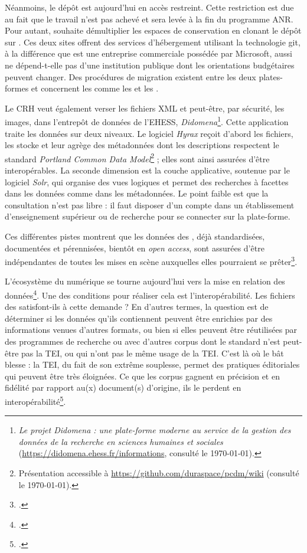 Néanmoins, le dépôt \gitlab{} est aujourd'hui en accès restreint. Cette restriction est due au fait que le travail n'est pas achevé et sera levée à la fin du programme ANR. Pour autant, \timeus{} souhaite démultiplier les espaces de conservation en clonant le dépôt \gitlab{} sur \github. Ces deux sites offrent des services d'hébergement utilisant la technologie git, à la différence que \github{} est une entreprise commerciale possédée par Microsoft, aussi ne dépend-t-elle pas d'une institution publique dont les orientations budgétaires peuvent changer. Des procédures de migration existent entre les deux plates-formes et concernent les \commits{} comme les \issues{} et les \mergerequests.

Le CRH veut également verser les fichiers XML et peut-être, par sécurité, les images, dans l'entrepôt de données de l'EHESS, \textit{Didomena}\footnote{\textit{Le projet Didomena : une plate-forme moderne au service de la gestion des données de la recherche en sciences humaines et sociales} (\url{https://didomena.ehess.fr/informations}, consulté le \today).}. Cette application traite les données sur deux niveaux. Le logiciel \textit{Hyrax} reçoit d'abord les fichiers, les stocke et leur agrège des métadonnées dont les descriptions respectent le standard \textit{Portland Common Data Model}\footnote{Présentation accessible à \url{https://github.com/duraspace/pcdm/wiki} (consulté le \today).} ; elles sont ainsi assurées d'être interopérables. La seconde dimension est la couche applicative, soutenue par le logiciel \textit{Solr}, qui organise des vues logiques et permet des recherches à facettes dans les données comme dans les métadonnées. Le point faible est que la consultation n'est pas libre : il faut disposer d'un compte dans un établissement d'enseignement supérieur ou de recherche pour se connecter sur la plate-forme.

Ces différentes pistes montrent que les données des \odm, déjà standardisées, documentées et pérennisées, bientôt en \textit{open access}, sont assurées d'être indépendantes de toutes les mises en scène auxquelles elles pourraient se prêter\footcite[p. 63]{jolivet}.

L'écosystème du numérique se tourne aujourd'hui vers la mise en relation des données\footcite[p. 66]{jolivet}. Une des conditions pour réaliser cela est l'interopérabilité. Les fichiers des \odm{} satisfont-ils à cette demande ? En d'autres termes, la question est de déterminer si les données qu'ils contiennent peuvent être enrichies par des informations venues d'autres formats, ou bien si elles peuvent être réutilisées par des programmes de recherche ou avec d'autres corpus dont le standard n'est peut-être pas la TEI, ou qui n'ont pas le même usage de la TEI. C'est là où le bât blesse : la TEI, du fait de son extrême souplesse, permet des pratiques éditoriales qui peuvent être très éloignées. Ce que les corpus gagnent en précision et en fidélité par rapport au(x) document(s) d'origine, ils le perdent en interopérabilité\footcite[p. 61-62]{jolivet}.

